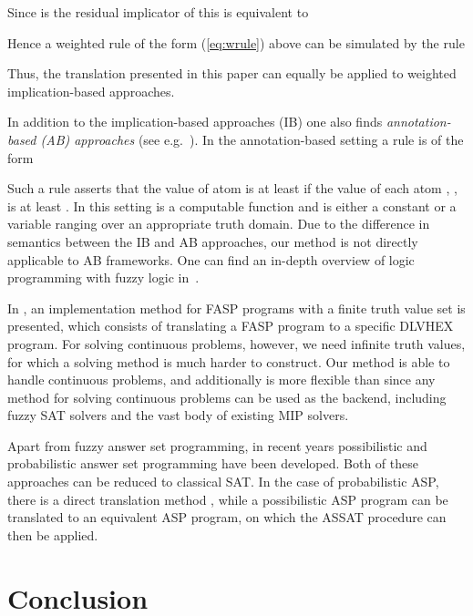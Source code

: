 \documentclass{tlp}
\begin{document}
 Since  is the residual implicator of  this is equivalent to 
 
 Hence a weighted rule of the form (\ref{eq:wrule}) above can be simulated by the rule
 
Thus, the translation presented in this paper can equally be applied to weighted implication-based approaches.

In addition to the implication-based approaches (IB) one also finds \emph{annotation-based (AB) approaches} (see e.g.~\cite{straccia-annotated}). In the annotation-based setting a rule is of the form 
 
Such a rule asserts that the value of atom  is at least  if the value of each atom , , is at least . In this setting  is a computable function and  is either a constant or a variable ranging over an appropriate truth domain. Due to the difference in semantics between the IB and AB approaches, our method is not directly applicable to AB frameworks. One can find an in-depth overview of logic programming with fuzzy logic in~\cite{Straccia:reasoningweb}.

In \cite{fasp1}, an implementation method for FASP programs with a finite truth value set is presented, which consists of translating a FASP program to a specific DLVHEX program. For solving continuous problems, however, we need infinite truth values, for which a solving method is much harder to construct. Our method is able to handle continuous problems, and additionally is more flexible than \cite{fasp1} since any method for solving continuous problems can be used as the backend, including fuzzy SAT solvers and the vast body of existing MIP solvers.

Apart from fuzzy answer set programming, in recent years possibilistic and probabilistic answer set programming have been developed. Both of these approaches can be reduced to classical SAT. In the case of probabilistic ASP, there is a direct translation method \cite{Saad:ECSQARU2009}, while a possibilistic ASP program can be translated to an equivalent ASP program, on which the ASSAT procedure can then be applied. 


\section{Conclusion}\label{sec:conclusion}
\end{document}
